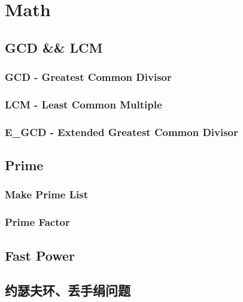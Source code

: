 \section{Math}
	\subsection{GCD \&\& LCM}
		\subsubsection{GCD - Greatest Common Divisor}
			
		\subsubsection{LCM - Least Common Multiple}
			
		\subsubsection{E\_GCD - Extended Greatest Common Divisor}
			
	\subsection{Prime}
		\subsubsection{Make Prime List}
			
		\subsubsection{Prime Factor}
			
	\subsection{Fast Power}
		
	\subsection{约瑟夫环、丢手绢问题}
		
